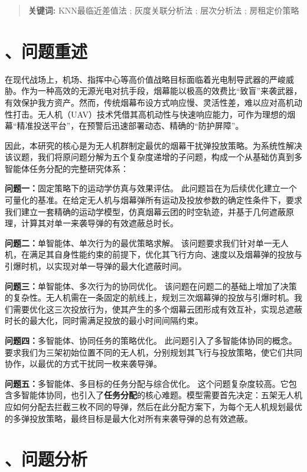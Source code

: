 \documentclass[12pt]{article}
\begin{document}
\begin{CJK}{UTF8}{gbsn}
\begin{abstract}
		\noindent\textbf{关键词:} KNN最临近差值法 ; 灰度关联分析法 ; 层次分析法 ; 房租定价策略
		
		
	\end{abstract}
	
	\newpage
	
	\section{、问题重述}

	
	在现代战场上，机场、指挥中心等高价值战略目标面临着光电制导武器的严峻威胁。作为一种高效的无源光电对抗手段，烟幕能以极高的效费比“致盲”来袭武器，有效保护我方资产。然而，传统烟幕布设方式响应慢、灵活性差，难以应对高机动性打击。无人机（UAV）技术凭借其高机动性与快速响应能力，可作为理想的烟幕“精准投送平台”，在预警后迅速部署动态、精确的“防护屏障”。
	
	因此，本研究的核心是为无人机群制定最优的烟幕干扰弹投放策略。为系统性解决该议题，我们将原问题分解为五个复杂度递增的子问题，构成一个从基础仿真到多智能体任务分配的完整研究体系：
	
	\textbf{问题一：}固定策略下的运动学仿真与效果评估。
	此问题旨在为后续优化建立一个可量化的基准。在给定无人机与烟幕弹所有运动及投放参数的确定性条件下，要求我们建立一套精确的运动学模型，仿真烟幕云团的时空轨迹，并基于几何遮蔽原理，计算其对单一来袭导弹的有效遮蔽总时长。
	
	\textbf{问题二：}单智能体、单次行为的最优策略求解。
	该问题要求我们针对单一无人机，在满足其自身性能约束的前提下，优化其飞行方向、速度以及烟幕弹的投放与引爆时机，以实现对单一导弹的最大化遮蔽时间。
	
	\textbf{问题三：}单智能体、多次行为的协同优化。
	该问题在问题二的基础上增加了决策的复杂性。无人机需在一条固定的航线上，规划三次烟幕弹的投放与引爆时机。我们需要优化这三次投放行为，使其产生的多个烟幕云团形成有效互补，实现总遮蔽时长的最大化，同时需满足投放的最小时间间隔约束。
	
	\textbf{问题四：}多智能体、协同任务的策略优化。
	此问题引入了多智能体协同的概念。要求我们为三架初始位置不同的无人机，分别规划其飞行与投放策略，使它们共同协作，以最优的方式干扰同一枚来袭导弹。
	
	\textbf{问题五：}多智能体、多目标的任务分配与综合优化。
	这个问题复杂度较高。它包含多智能体协同，也引入了\textbf{任务分配}的核心难题。模型需要首先决定：五架无人机应如何分配去拦截三枚不同的导弹，然后在此分配方案下，为每个无人机规划最优的多弹投放策略，最终目标是最大化对所有来袭导弹的总有效遮蔽。
	
	\section{、问题分析}


\end{CJK}
\end{document}
